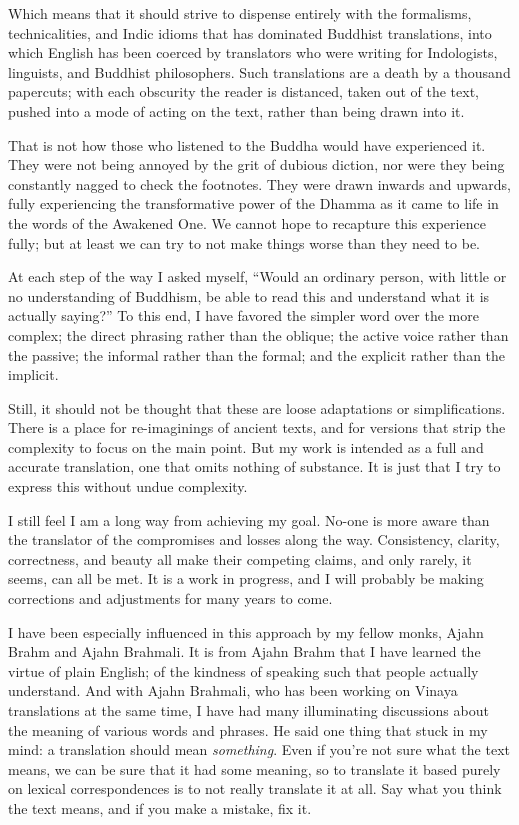 \documentclass[12pt,openany]{book}%
\begin{document}
Which means that it should strive to dispense entirely with the formalisms, technicalities, and Indic idioms that has dominated Buddhist translations, into which English has been coerced by translators who were writing for Indologists, linguists, and Buddhist philosophers. Such translations are a death by a thousand papercuts; with each obscurity the reader is distanced, taken out of the text, pushed into a mode of acting on the text, rather than being drawn into it.

That is not how those who listened to the Buddha would have experienced it. They were not being annoyed by the grit of dubious diction, nor were they being constantly nagged to check the footnotes. They were drawn inwards and upwards, fully experiencing the transformative power of the Dhamma as it came to life in the words of the Awakened One. We cannot hope to recapture this experience fully; but at least we can try to not make things worse than they need to be.

At each step of the way I asked myself, “Would an ordinary person, with little or no understanding of Buddhism, be able to read this and understand what it is actually saying?” To this end, I have favored the simpler word over the more complex; the direct phrasing rather than the oblique; the active voice rather than the passive; the informal rather than the formal; and the explicit rather than the implicit.

Still, it should not be thought that these are loose adaptations or simplifications. There is a place for re-imaginings of ancient texts, and for versions that strip the complexity to focus on the main point. But my work is intended as a full and accurate translation, one that omits nothing of substance. It is just that I try to express this without undue complexity.

I still feel I am a long way from achieving my goal. No-one is more aware than the translator of the compromises and losses along the way. Consistency, clarity, correctness, and beauty all make their competing claims, and only rarely, it seems, can all be met. It is a work in progress, and I will probably be making corrections and adjustments for many years to come.

I have been especially influenced in this approach by my fellow monks, Ajahn Brahm and Ajahn Brahmali. It is from Ajahn Brahm that I have learned the virtue of plain English; of the kindness of speaking such that people actually understand. And with Ajahn Brahmali, who has been working on Vinaya translations at the same time, I have had many illuminating discussions about the meaning of various words and phrases. He said one thing that stuck in my mind: a translation should mean \emph{something}. Even if you’re not sure what the text means, we can be sure that it had some meaning, so to translate it based purely on lexical correspondences is to not really translate it at all. Say what you think the text means, and if you make a mistake, fix it.
\end{document}
